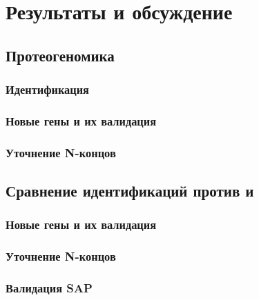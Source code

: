 \section{Результаты и обсуждение}

\subsection{Протеогеномика }
\subsubsection{Идентификация}
\subsubsection{Новые гены и их валидация}
\subsubsection{Уточнение N-концов}

\subsection{Сравнение идентификаций против  и }
\subsubsection{Новые гены и их валидация}
\subsubsection{Уточнение N-концов}
\subsubsection{Валидация SAP}

\newpage
